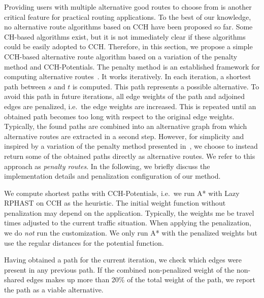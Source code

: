 \documentclass[a4paper, english, cleveref]{lipics-v2021}
\begin{document}
Providing users with multiple alternative good routes to choose from is another critical feature for practical routing applications.
To the best of our knowledge, no alternative route algorithms based on CCH have been proposed so far.
Some CH-based algorithms exist, but it is not immediately clear if these algorithms could be easily adopted to CCH.
Therefore, in this section, we propose a simple CCH-based alternative route algorithm based on a variation of the penalty method and CCH-Potentials.
The penalty method is an established framework for computing alternative routes~\cite{bdgs-argrn-11,krs-eepma-13,pz-iarp-13,kobitzsch2015alternative}.
It works iteratively.
In each iteration, a shortest path between $s$ and $t$ is computed.
This path represents a possible alternative.
To avoid this path in future iterations, all edge weights of the path and adjoined edges are penalized, i.e.\ the edge weights are increased.
This is repeated until an obtained path becomes too long with respect to the original edge weights.
Typically, the found paths are combined into an alternative graph from which alternative routes are extracted in a second step.
However, for simplicity and inspired by a variation of the penalty method presented in~\cite{adgw-arrn-13}, we choose to instead return some of the obtained paths directly as alternative routes.
We refer to this approach as \emph{penalty routes}.
In the following, we briefly discuss the implementation details and penalization configuration of our method.


We compute shortest paths with CCH-Potentials, i.e.\ we run A* with Lazy RPHAST on CCH as the heuristic.
The initial weight function without penalization may depend on the application.
Typically, the weights me be travel times adjusted to the current traffic situation.
When applying the penalization, we do \emph{not} run the customization.
We only run A* with the penalized weights but use the regular distances for the potential function.

Having obtained a path for the current iteration, we check which edges were present in any previous path.
If the combined non-penalized weight of the non-shared edges makes up more than 20\% of the total weight of the path, we report the path as a viable alternative.
\end{document}
